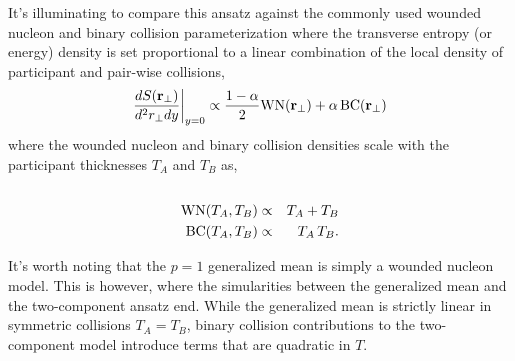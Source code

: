 \documentclass[aps,prl,reprint,amsmath,nofootinbib]{revtex4-1}
\begin{document}
It's illuminating to compare this ansatz against the commonly used wounded nucleon and binary collision parameterization where the transverse entropy (or energy) density 
is set proportional to a linear combination of the local density of participant and pair-wise collisions,
\begin{equation}
 \frac{dS({\bf r}_\perp)}{d^2r_\perp dy} \biggr \rvert_{y=0}  \propto \frac{1-\alpha}{2}\mbox{WN}({\bf r_\perp}) + \alpha\, \mbox{BC}({\bf r_\perp}) 
\end{equation}
where the wounded nucleon and binary collision densities scale with the participant thicknesses $T_A$ and $T_B$ as,
\begin{eqnarray}
 \cr \mbox{WN}(T_A,T_B) &\propto& T_A + T_B \\
 \label{binary collisions}
 \mbox{BC}(T_A,T_B) &\propto& T_A\,T_B.
\end{eqnarray}

It's worth noting that the $p=1$ generalized mean is simply a wounded nucleon model. This is however, where the simularities between the generalized
mean and the two-component ansatz end. While the generalized mean is strictly linear in symmetric collisions $T_A=T_B$, binary collision contributions to the 
two-component model introduce terms that are quadratic in $T$.



\end{document}
